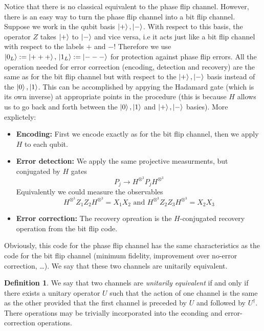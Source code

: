 \documentclass[11pt,a4paper]{article}
\theoremstyle{definition}
\newtheorem{definition}{Definition}[section]
\theoremstyle{plain}
\theoremstyle{remark}
\begin{document}
Notice that there is no classical equivalent to the phase flip channel. However, there is an easy way to turn the phase flip channel into a bit flip channel. 
Suppose we work in the qubit basis $\ket{+}, \ket{-}$. With respect to this basis, the operator $Z$ takes $\ket{+}$ to $\ket{-}$ and vice versa, i.e it acts just like a bit flip 
channel with respect to the labels $+$ and $-$! Therefore we use $\ket{0_L} := \ket{+++}, \, \ket{1_L} := \ket{---}$ for protection against phase flip errors. All the operation needed for error correction 
(encoding, detection and recovery) are the same as for the bit flip channel but with respect to the $\ket{+}, \ket{-}$ basis instead of the $\ket{0}, \ket{1}$. This can be accomplished by appying the Hadamard gate (which is its own inverse) 
at appropriate points in the procedure (this is because $H$ allows us to go back and forth between the $\ket{0}, \ket{1}$ and $\ket{+}, \ket{-}$ basies).
More explictely: 
\begin{itemize}
\item \textbf{Encoding:} First we encode exactly as for the bit flip channel, then we apply $H$ to each qubit. 

\item \textbf{Error detection:} We apply the same projective measurments, but conjugated by $H$ gates 
$$P_j \to H^{\otimes^3} P_j H^{\otimes^3}$$
Equivalently we could measure the observables
$$H^{\otimes^3} Z_1 Z_2 H^{\otimes^3} = X_1 X_2 \text{ and } H^{\otimes^3} Z_2 Z_3 H^{\otimes^3} = X_2 X_3$$

\item \textbf{Error correction:} The recovery opreation is the $H$-conjugated recovery operation from the bit flip code. 
\end{itemize}

Obviously, this code for the phase flip channel has the same characteristics as the code for the bit flip channel (minimum fidelity, improvement over no-error correction, \dots). We say that these two channels are unitarily equivalent. 

\begin{definition}
We say that two channels are \emph{unitarily equivalent} if and only if there exists a unitary operator $U$ such that the action of one channel is the same as the other provided that the first channel 
is preceded by $U$ and followed by $U^\dagger$. There operations may be trivially incorporated into the econding and error-correction operations. 
\end{definition}
\end{document}
